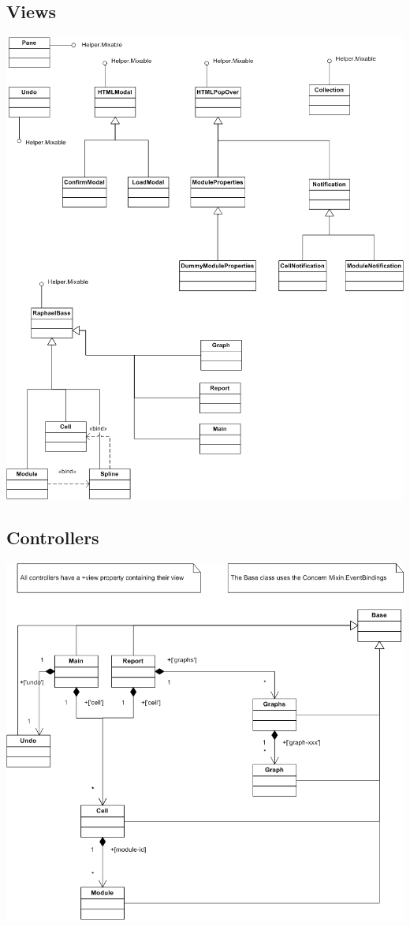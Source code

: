 \documentclass{report}
\begin{document}
				\subsection{Views}
					\includegraphics[scale=0.2]{views.png}
					
				\subsection{Controllers}
					\includegraphics[scale=0.2]{controllers.png}
					
\end{document}
